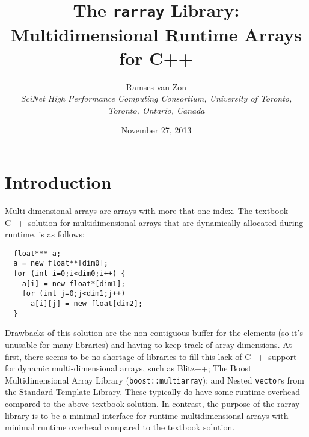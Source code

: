 \documentclass[12pt,twoside]{article}
\newcommand{\cxx}{C{++}}
\begin{document}
\setlength{\parskip}{1mm}

\title{The \texttt{rarray} Library:\\Multidimensional Runtime Arrays for \cxx}

\author{Ramses van Zon\\
\it\small SciNet High Performance Computing Consortium, University
of Toronto, Toronto, Ontario, Canada\vspace{-8pt}} 

\date{\small November 27, 2013\vspace{-5mm}}

\maketitle

\section{Introduction}

Multi-dimensional arrays are arrays with more that one index.  
The textbook \cxx\ solution for multidimensional arrays that are
dynamically allocated during runtime, is as follows:
\vspace{-5pt}\begin{framed}\vspace{-14pt}%
\begin{verbatim}
  float*** a;
  a = new float**[dim0];
  for (int i=0;i<dim0;i++) {
    a[i] = new float*[dim1];
    for (int j=0;j<dim1;j++) 
      a[i][j] = new float[dim2];
  }
\end{verbatim}%
\vspace{-12pt}\end{framed}\vspace{-5pt}%
Drawbacks of this solution are the non-contiguous buffer for the
elements (so it's unusable for many libraries) and having to keep
track of array dimensions.
At first, there seems to be no shortage of libraries to fill this
lack of \cxx\ support for dynamic multi-dimensional arrays, such as
Blitz++;
The Boost Multidimensional Array Library (\texttt{boost::multiarray}); 
and
Nested \texttt{vector}s from the Standard Template Library.
These typically do have some runtime overhead compared to the above
textbook solution. In contrast, the purpose of the rarray
library is to be a minimal interface for runtime multidimensional arrays with
minimal runtime overhead compared to the textbook solution.
\end{document}
